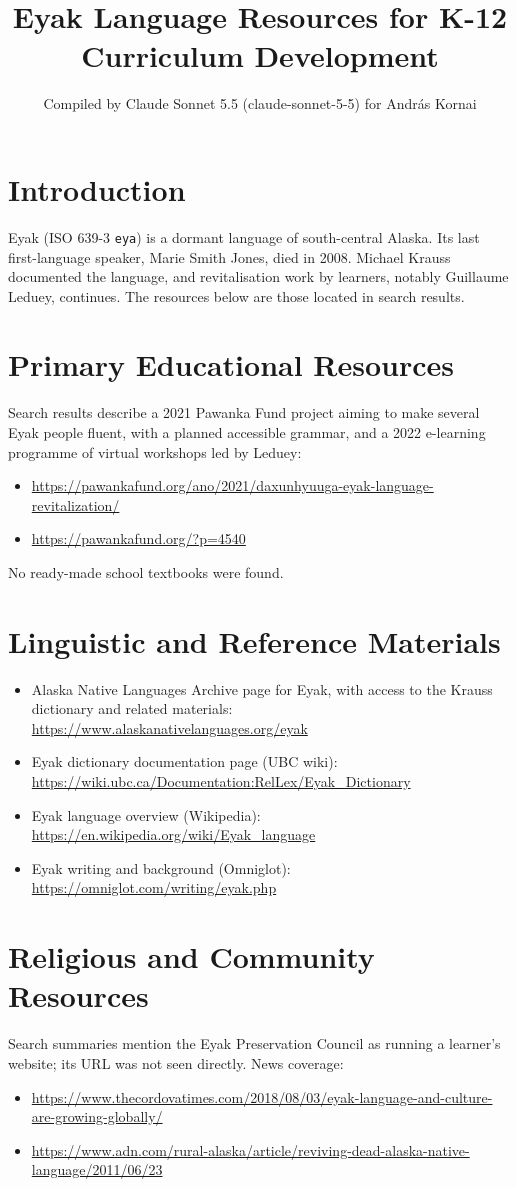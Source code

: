 \documentclass[12pt]{article}
\title{Eyak Language Resources for K-12 Curriculum Development}
\author{Compiled by Claude Sonnet 5.5 (claude-sonnet-5-5) for Andr\'as Kornai}
\date{}
\begin{document}
\maketitle

\section{Introduction}
Eyak (ISO 639-3 \texttt{eya}) is a dormant language of south-central Alaska. Its last first-language speaker, Marie Smith Jones, died in 2008. Michael Krauss documented the language, and revitalisation work by learners, notably Guillaume Leduey, continues. The resources below are those located in search results.

\section{Primary Educational Resources}
Search results describe a 2021 Pawanka Fund project aiming to make several Eyak people fluent, with a planned accessible grammar, and a 2022 e-learning programme of virtual workshops led by Leduey:
\begin{itemize}
\item \url{https://pawankafund.org/ano/2021/daxunhyuuga-eyak-language-revitalization/}
\item \url{https://pawankafund.org/?p=4540}
\end{itemize}
No ready-made school textbooks were found.

\section{Linguistic and Reference Materials}
\begin{itemize}
\item Alaska Native Languages Archive page for Eyak, with access to the Krauss dictionary and related materials: \url{https://www.alaskanativelanguages.org/eyak}
\item Eyak dictionary documentation page (UBC wiki): \url{https://wiki.ubc.ca/Documentation:RelLex/Eyak_Dictionary}
\item Eyak language overview (Wikipedia): \url{https://en.wikipedia.org/wiki/Eyak_language}
\item Eyak writing and background (Omniglot): \url{https://omniglot.com/writing/eyak.php}
\end{itemize}

\section{Religious and Community Resources}
Search summaries mention the Eyak Preservation Council as running a learner's website; its URL was not seen directly. News coverage:
\begin{itemize}
\item \url{https://www.thecordovatimes.com/2018/08/03/eyak-language-and-culture-are-growing-globally/}
\item \url{https://www.adn.com/rural-alaska/article/reviving-dead-alaska-native-language/2011/06/23}
\end{itemize}
\end{document}
